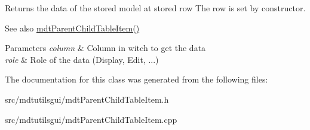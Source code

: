 Returns the data of the stored model at stored row The row is set by constructor. 

\begin{DoxySeeAlso}{See also}
\hyperlink{classmdt_parent_child_table_item_ad1a5c00ca1d0367d631548fa5732d41c}{mdtParentChildTableItem()} 
\end{DoxySeeAlso}

\begin{DoxyParams}{Parameters}
{\em column} & Column in witch to get the data \\
\hline
{\em role} & Role of the data (Display, Edit, ...) \\
\hline
\end{DoxyParams}


The documentation for this class was generated from the following files:\begin{DoxyCompactItemize}
\item 
src/mdtutilsgui/mdtParentChildTableItem.h\item 
src/mdtutilsgui/mdtParentChildTableItem.cpp\end{DoxyCompactItemize}
